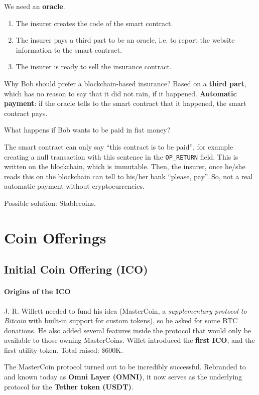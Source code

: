 We need an \textbf{oracle}.
\begin{enumerate}
    \item The insurer creates the code of the smart contract.
    \item The insurer pays a third part to be an oracle, i.e. to report the website information to the smart contract.
    \item The insurer is ready to sell the insurance contract.
\end{enumerate}

Why Bob should prefer a blockchain-based insurance? Based on a \textbf{third part}, which has no reason to say that it did not rain, if it happened.
\textbf{Automatic payment}: if the oracle tells to the smart contract that it happened, the smart contract pays.

What happens if Bob wants to be paid in fiat money?

The smart contract can only say ``this contract is to be paid'', for example creating a null transaction with this sentence in the \texttt{OP\_RETURN} field. This is written on the blockchain, which is immutable. Then, the insurer, once he/she reads this on the blockchain can tell to his/her bank ``please, pay''.
So, not a real automatic payment without cryptocurrencies.

Possible solution: Stablecoins.

\section{Coin Offerings}

\subsection{Initial Coin Offering (ICO)}

\paragraph{Origins of the ICO} J. R. Willett needed to fund his idea (MasterCoin, a \emph{supplementary protocol to Bitcoin} with built-in support for custom tokens), so he asked for some BTC donations. He also added several features inside the protocol that would only be available to those owning MasterCoins.
Willet introduced the \textbf{first ICO}, and the first utility token.
Total raised: \$600K.

The MasterCoin protocol turned out to be incredibly successful. Rebranded to and known today as \textbf{Omni Layer (OMNI)}, it now serves as the underlying protocol for the \textbf{Tether token (USDT)}.

